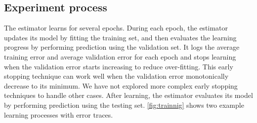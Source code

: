 \documentclass[twocolumn]{article}
\begin{document}
\subsection{Experiment process}
The estimator learns for several epochs.
During each epoch, the estimator updates its model by fitting the training set, 
and then evaluates the learning progress by performing prediction using the 
validation set.
It logs the average training error and average validation error for each epoch 
and stops learning when the validation error starts increasing to reduce 
over-fitting.
This early stopping technique can work well when the validation error 
monotonically decrease to its minimum.
We have not explored more complex early stopping techniques to handle other 
cases.
After learning, the estimator evaluates its model by performing prediction 
using the testing set.
\autoref{fig:trainnig} shows two example learning processes with error traces.
\end{document}
